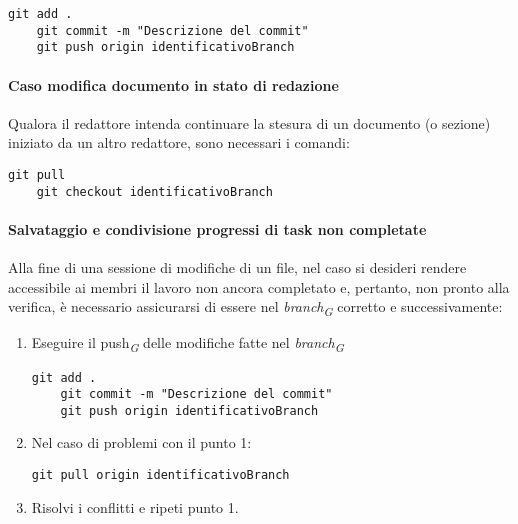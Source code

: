 \vspace{0.1cm}
\begin{lstlisting}[style=code]
    git add .
    git commit -m "Descrizione del commit"
    git push origin identificativoBranch
\end{lstlisting}

\paragraph*{\textbf{Caso modifica documento in stato di redazione}}
Qualora il redattore intenda continuare la stesura di un documento (o sezione) iniziato da un altro redattore, sono necessari i comandi:

\vspace{0.1cm}
\begin{lstlisting}[style=code]
    git pull
    git checkout identificativoBranch
\end{lstlisting}

\hypertarget{par:salvataggioecondivisioneprogressitasknoncompletate}{\paragraph*{{\textbf{Salvataggio e condivisione progressi di task non completate}}}}
Alla fine di una sessione di modifiche di un file, nel caso si desideri rendere accessibile ai membri il lavoro non ancora completato e, pertanto, non pronto alla verifica, è necessario assicurarsi di essere nel \textit{branch}\textsubscript{\textit{G}} corretto e successivamente:
\begin{enumerate}
    \item Eseguire il push\textsubscript{\textit{G}}  delle modifiche fatte nel \textit{branch}\textsubscript{\textit{G}}
    \vspace{0.1cm}
    \begin{lstlisting}[style=code]
    git add .
    git commit -m "Descrizione del commit"
    git push origin identificativoBranch
    \end{lstlisting}

    \item Nel caso di problemi con il punto 1:
    \vspace{0.1cm}
    \begin{lstlisting}[style=code]
    git pull origin identificativoBranch
    \end{lstlisting}
    \item Risolvi i conflitti e ripeti punto 1.
\end{enumerate}

